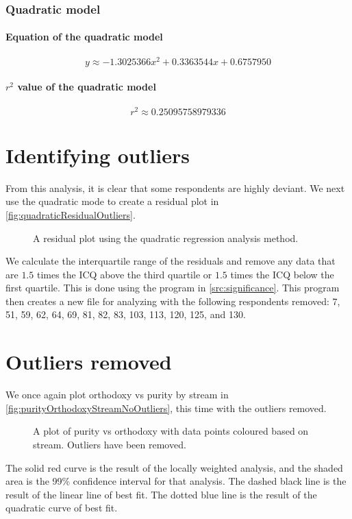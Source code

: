 \subsubsection{Quadratic model}
\paragraph{Equation of the quadratic model}
\[y \approx \num{-1.3025366}x^2 + \num{0.3363544}x + \num{0.6757950}\]
\paragraph{$r^2$ value of the quadratic model}
\[r^2 \approx \num{0.25095758979336}\]

\section{Identifying outliers}
From this analysis, it is clear that some respondents are highly deviant.
We next use the quadratic mode to create a residual plot in \vref{fig:quadraticResidualOutliers}.

\begin{figure}[H]
	\caption{A residual plot using the quadratic regression analysis method.}
	\label{fig:quadraticResidualOutliers}
\end{figure}

We calculate the interquartile range of the residuals and remove any data that are $1.5$ times the ICQ above the third quartile or $1.5$ times the ICQ below the first quartile.
This is done using the program in \vref{src:significance}.
This program then creates a new file for analyzing with the following respondents removed: 7, 51, 59, 62, 64, 69, 81, 82, 83, 103, 113, 120, 125, and 130.

\section{Outliers removed}
We once again plot orthodoxy vs purity by stream in \vref{fig:purityOrthodoxyStreamNoOutliers}, this time with the outliers removed.
\begin{figure}[H]
	\caption{A plot of purity vs orthodoxy with data points coloured based on stream. Outliers have been removed.}
	\label{fig:purityOrthodoxyStreamNoOutliers}
\end{figure}
The solid red curve is the result of the locally weighted analysis, and the shaded area is the 99\% confidence interval for that analysis.
The dashed black line is the result of the linear line of best fit.
The dotted blue line is the result of the quadratic curve of best fit.

